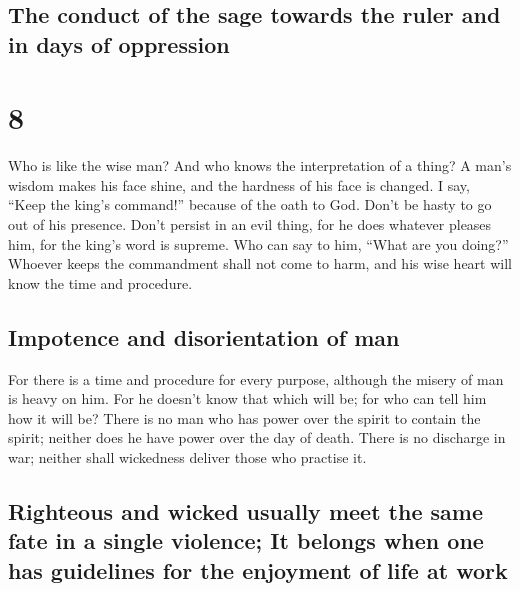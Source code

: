 \hypertarget{the-conduct-of-the-sage-towards-the-ruler-and-in-days-of-oppression}{%
\subsection{The conduct of the sage towards the ruler and in days of
oppression}\label{the-conduct-of-the-sage-towards-the-ruler-and-in-days-of-oppression}}

\hypertarget{section-7}{%
\section{8}\label{section-7}}

 Who is like the wise man? And who knows the
interpretation of a thing? A man's wisdom makes his face shine, and the
hardness of his face is changed.  I say, ``Keep the king's
command!'' because of the oath to God.  Don't be hasty to
go out of his presence. Don't persist in an evil thing, for he does
whatever pleases him,  for the king's word is supreme. Who
can say to him, ``What are you doing?''  Whoever keeps the
commandment shall not come to harm, and his wise heart will know the
time and procedure.

\hypertarget{impotence-and-disorientation-of-man}{%
\subsection{Impotence and disorientation of
man}\label{impotence-and-disorientation-of-man}}

 For there is a time and procedure for every purpose,
although the misery of man is heavy on him.  For he
doesn't know that which will be; for who can tell him how it will be?
 There is no man who has power over the spirit to contain
the spirit; neither does he have power over the day of death. There is
no discharge in war; neither shall wickedness deliver those who practise
it.

\hypertarget{righteous-and-wicked-usually-meet-the-same-fate-in-a-single-violence-it-belongs-when-one-has-guidelines-for-the-enjoyment-of-life-at-work}{%
\subsection{Righteous and wicked usually meet the same fate in a single
violence; It belongs when one has guidelines for the enjoyment of life
at
work}\label{righteous-and-wicked-usually-meet-the-same-fate-in-a-single-violence-it-belongs-when-one-has-guidelines-for-the-enjoyment-of-life-at-work}}

